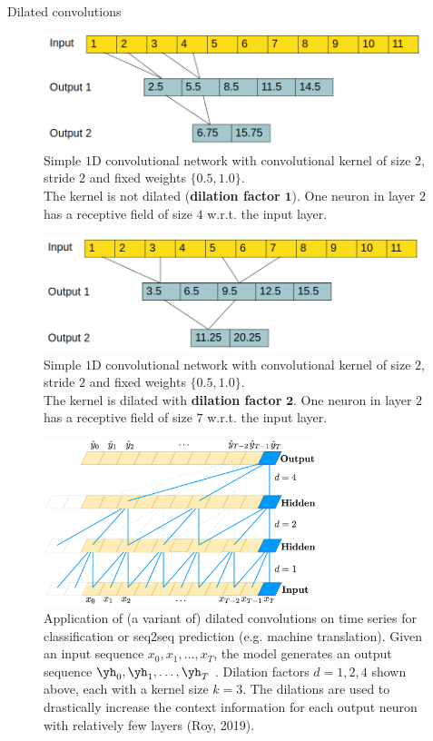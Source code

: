 \begin{vbframe}{Dilated convolutions}
\framebreak 

    \vspace*{0.5cm}
    \begin{figure}
        \centering
        \includegraphics[width=11cm]{figure/dilatedconv-4.png}
        \caption{Simple $1$D convolutional network with convolutional kernel of size $2$, stride $2$ and fixed weights $\{0.5, 1.0\}$. \\ The kernel is not dilated (\textbf{dilation factor} $\mathbf{1}$). One neuron in layer $2$ has a receptive field of size $4$ w.r.t. the input layer. }
    \end{figure}
\framebreak 
    \vspace*{0.5cm}
    \begin{figure}
        \centering
        \includegraphics[width=11cm]{figure/dilatedconv-5.png}
        \caption{Simple $1$D convolutional network with convolutional kernel of size $2$, stride $2$ and fixed weights $\{0.5, 1.0\}$. \\ The kernel is dilated with \textbf{dilation factor} $\mathbf{2}$. One neuron in layer $2$ has a receptive field of size $7$ w.r.t. the input layer. }
    \end{figure}
    
\framebreak 

    \begin{figure}
        \centering
        \includegraphics[width=8cm]{plots/05_conv_variations/dilated/tcn.png}
        \caption{Application of (a variant of) dilated convolutions on time series for classification or seq2seq prediction (e.g. machine translation). Given an input sequence $x_0,x_1, \ldots, x_T$, the model generates an output sequence $\yh_0,\yh_1, \ldots, \yh_T$ . Dilation factors $d = 1, 2, 4$ shown above, each with a kernel size $k = 3$. The dilations are used to drastically increase the context information for each output neuron with relatively few layers (Roy, 2019).}
    \end{figure}

\end{vbframe}
